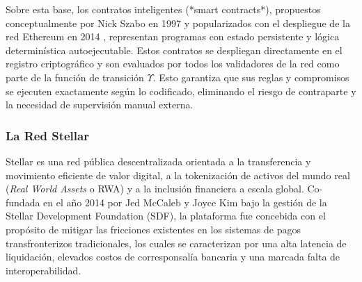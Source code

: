 Sobre esta base, los contratos inteligentes (*smart contracts*), propuestos conceptualmente por Nick Szabo en 1997 \cite{szabo1997formalizing} y popularizados con el despliegue de la red Ethereum en 2014 \cite{wood2014ethereum}, representan programas con estado persistente y lógica determinística autoejecutable. Estos contratos se despliegan directamente en el registro criptográfico y son evaluados por todos los validadores de la red como parte de la función de transición $\Upsilon$. Esto garantiza que sus reglas y compromisos se ejecuten exactamente según lo codificado, eliminando el riesgo de contraparte y la necesidad de supervisión manual externa.

\subsubsection{La Red Stellar}

Stellar es una red pública descentralizada orientada a la transferencia y movimiento eficiente de valor digital, a la tokenización de activos del mundo real (\textit{Real World Assets} o RWA) y a la inclusión financiera a escala global. Co-fundada en el año 2014 por Jed McCaleb y Joyce Kim bajo la gestión de la Stellar Development Foundation (SDF), la plataforma fue concebida con el propósito de mitigar las fricciones existentes en los sistemas de pagos transfronterizos tradicionales, los cuales se caracterizan por una alta latencia de liquidación, elevados costos de corresponsalía bancaria y una marcada falta de interoperabilidad.

